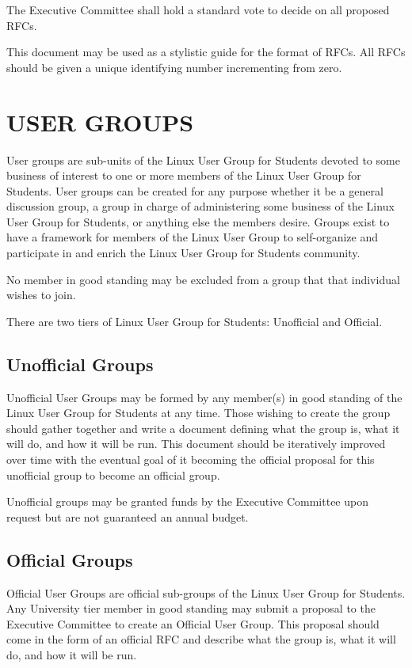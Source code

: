\documentclass[letter]{report}
\begin{document}
The Executive Committee shall hold a standard vote to decide on all proposed
RFCs.

This document may be used as a stylistic guide for the format of RFCs. All RFCs
should be given a unique identifying number incrementing from zero.


\chapter{USER GROUPS}
User groups are sub-units of the Linux User Group for Students devoted to some business of
interest to one or more members of the Linux User Group for Students. User groups can be
created for any purpose whether it be a general discussion group, a group in
charge of administering some business of the Linux User Group for Students, or anything else
the members desire. Groups exist to have a framework for members of the Linux
User Group to self-organize and participate in and enrich the Linux User Group for Students
community.

No member in good standing may be excluded from a group that that individual
wishes to join.

There are two tiers of Linux User Group for Students: Unofficial and Official.

\section{Unofficial Groups}
Unofficial User Groups may be formed by any member(s) in good standing of the
Linux User Group for Students at any time. Those wishing to create the group should gather
together and write a document defining what the group is, what it will do, and
how it will be run. This document should be iteratively improved over time with
the eventual goal of it becoming the official proposal for this unofficial group
to become an official group.

Unofficial groups may be granted funds by the Executive Committee upon request
but are not guaranteed an annual budget.

\section{Official Groups}
Official User Groups are official sub-groups of the Linux User Group for Students. Any
University tier member in good standing may submit a proposal to the Executive
Committee to create an Official User Group. This proposal should come in the
form of an official RFC and describe what the group is, what it will do, and how
it will be run.
\end{document}
